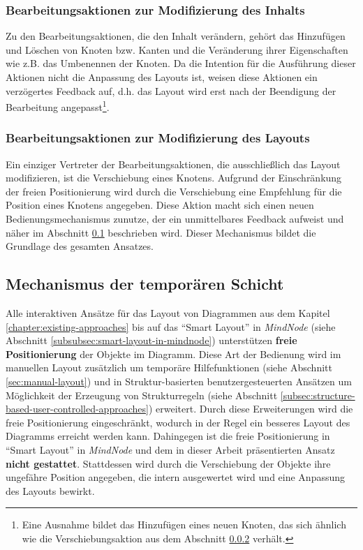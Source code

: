 \subsubsection{Bearbeitungsaktionen zur Modifizierung des Inhalts}

Zu den Bearbeitungsaktionen, die den Inhalt verändern, gehört das Hinzufügen und Löschen von Knoten bzw. Kanten und die Veränderung ihrer Eigenschaften wie z.B. das Umbenennen der Knoten. Da die Intention für die Ausführung dieser Aktionen nicht die Anpassung des Layouts ist, weisen diese Aktionen ein verzögertes Feedback auf, d.h. das Layout wird erst nach der Beendigung der Bearbeitung angepasst\footnote{Eine Ausnahme bildet das Hinzufügen eines neuen Knoten, das sich ähnlich wie die Verschiebungsaktion aus dem Abschnitt \ref{subsubsec:edit-action-for-modifying-layout} verhält.}.

\subsubsection{Bearbeitungsaktionen zur Modifizierung des Layouts}
\label{subsubsec:edit-action-for-modifying-layout}

Ein einziger Vertreter der Bearbeitungsaktionen, die ausschließlich das Layout modifizieren, ist die Verschiebung eines Knotens. Aufgrund der Einschränkung der freien Positionierung wird durch die Verschiebung eine Empfehlung für die Position eines Knotens angegeben. Diese Aktion macht sich einen neuen Bedienungsmechanismus zunutze, der ein unmittelbares Feedback aufweist und näher im Abschnitt \ref{subsec:temporary-layer-mechanism} beschrieben wird. Dieser Mechanismus bildet die Grundlage des gesamten Ansatzes.

\subsection{Mechanismus der temporären Schicht}
\label{subsec:temporary-layer-mechanism}

Alle interaktiven Ansätze für das Layout von Diagrammen aus dem Kapitel \ref{chapter:existing-approaches} bis auf das \enquote{Smart Layout} in \textit{MindNode} (siehe Abschnitt \ref{subsubsec:smart-layout-in-mindnode}) unterstützen \textbf{freie Positionierung} der Objekte im Diagramm. Diese Art der Bedienung wird im manuellen Layout zusätzlich um temporäre Hilfefunktionen (siehe Abschnitt \ref{sec:manual-layout}) und in Struktur-basierten benutzergesteuerten Ansätzen um Möglichkeit der Erzeugung von Strukturregeln (siehe Abschnitt \ref{subsec:structure-based-user-controlled-approaches}) erweitert. Durch diese Erweiterungen wird die freie Positionierung eingeschränkt, wodurch in der Regel ein besseres Layout des Diagramms erreicht werden kann. Dahingegen ist die freie Positionierung in \enquote{Smart Layout} in \textit{MindNode} und dem in dieser Arbeit präsentierten Ansatz \textbf{nicht gestattet}. Stattdessen wird durch die Verschiebung der Objekte ihre ungefähre Position angegeben, die intern ausgewertet wird und eine Anpassung des Layouts bewirkt.

